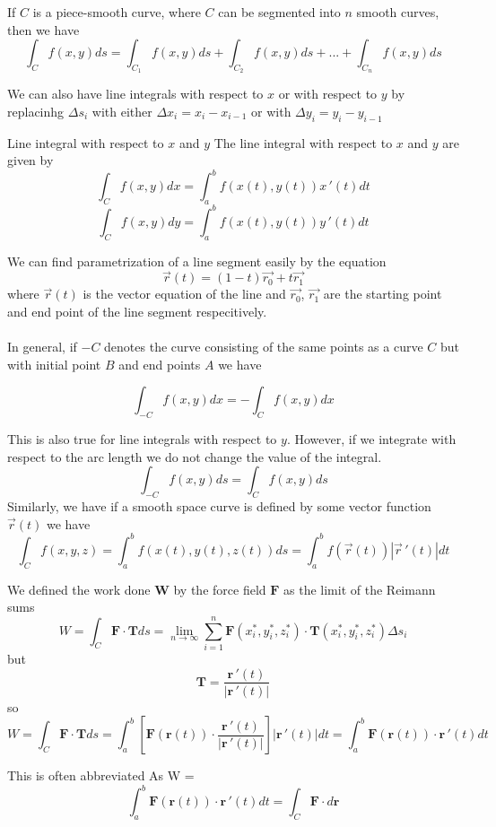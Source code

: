 \documentclass{article}
\begin{document}
	If $C$ is a piece-smooth curve, where $C$ can be segmented into $n$ smooth curves,
	then we have
	\[
		\int_{C} f(x,y)ds = \int_{C_1}f(x,y)ds + \int_{C_2}f(x,y)ds + ...+ \int_{C_n}
		f(x,y)ds
	\]

	We can also have line integrals with respect to $x$ or with respect to $y$ by replacinhg
	$\Delta s_{i}$ with either $\Delta x_{i} = x_{i} - x_{i-1}$ or with $\Delta y_{i}
	= y_{i} - y_{i-1}$

	\begin{mybox}
		{Line integral with respect to $x$ and $y$} The line integral with respect to
		$x$ and $y$ are given by
		\[
			\int_{C} f(x,y)dx = \int_{a}^{b} f(x(t),y(t))x\,'(t)dt
		\]
		\[
			\int_{C} f(x,y)dy = \int_{a}^{b} f(x(t),y(t))y\,'(t)dt
		\]
	\end{mybox}

	We can find parametrization of a line segment easily by the equation
	\[
		\vec{r}(t) = (1-t)\vec{r_0}+t\vec{r_1}
	\]
	where $\vec{r}(t)$ is the vector equation of the line and $\vec{r_0}$,
	$\vec{r_1}$ are the starting point and end point of the line segment
	respecitively. \\\\ In general, if $-C$ denotes the curve consisting of the same
	points as a curve $C$ but with initial point $B$ and end points $A$ we have

	\[
		\int_{-C}f(x,y)dx = - \int_{C}f(x,y)dx
	\]

	This is also true for line integrals with respect to $y$. However, if we integrate
	with respect to the arc length we do not change the value of the integral.
	\[
		\int_{-C}f(x,y)ds = \int_{C}f(x,y)ds
	\]
	Similarly, we have if a smooth space curve is defined by some vector function $\vec
	{r}(t)$ we have
	\[
		\int_{C} f(x,y,z) = \int_{a}^{b} f(x(t),y(t),z(t))ds = \int_{a}^{b} f(\vec{r}
		(t))|\vec{r}\,'(t)|dt
	\]

	We defined the work done $\bm{W}$ by the force field $\bm{F}$ as the limit of
	the Reimann sums
	\[
		W = \int_{C} \bm{F}\cdot \bm{T}ds = \lim_{n \to \infty}\sum_{i=1}^{n}\bm{F}(x
		_{i}^{*}, y_{i}^{*}, z_{i}^{*}) \cdot \bm{T}(x_{i}^{*}, y_{i}^{*}, z_{i}^{*})
		\Delta s_{i}
	\]
	but
	\[
		\bm{T}= \frac{\bm{r}\,'(t)}{|\bm{r}\,'(t)|}
	\]
	so
	\[
		W = \int_{C} \bm{F}\cdot \bm{T}ds = \int_{a}^{b} \left[ \bm{F}(\bm{r}(t)) \cdot
		\frac{\bm{r}\,'(t)}{|\bm{r}\,'(t)|}\right] |\bm{r}\,'(t)| dt = \int_{a}^{b} \bm
		{F}(\bm{r}(t)) \cdot \bm{r}\,'(t) dt
	\]

	This is often abbreviated As W =
	\[
		\int_{a}^{b} \bm{F}(\bm{r}(t)) \cdot \bm{r}\,'(t) dt = \int_{C} \bm{F}\cdot d
		\bm{r}
	\]
\end{document}
